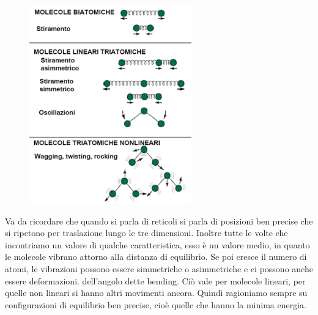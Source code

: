 \hspace{0.7cm}\begin{minipage}{0.5 \textwidth}
    \begin{figure}[H]
        \includegraphics[width=7cm]{immagini/vibrazioni.png}
    \end{figure}
\end{minipage}
\begin{minipage}{0.4 \textwidth}
\vspace{-0.4cm}Va da ricordare che quando si parla di reticoli si parla di posizioni ben precise che si ripetono per traslazione lungo le tre dimensioni. Inoltre tutte le volte che incontriamo un valore di qualche caratteristica, esso è un valore medio, in quanto le molecole vibrano attorno alla distanza di equilibrio. Se poi cresce il numero di atomi, le vibrazioni possono essere simmetriche o asimmetriche e ci possono anche essere deformazioni. dell'angolo dette bending. Ciò vale per molecole lineari, per quelle non lineari si hanno altri movimenti ancora. Quindi ragioniamo sempre su configurazioni di equilibrio ben precise, cioè quelle che hanno la minima energia.
\end{minipage}